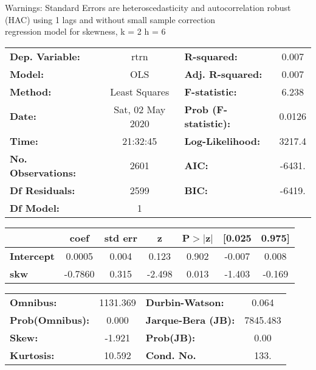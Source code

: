 Warnings: \newline
 [1] Standard Errors are heteroscedasticity and autocorrelation robust (HAC) using 1 lags and without small sample correction\\ 

regression model for skewness, k = 2 h = 6\begin{center}
\begin{tabular}{lclc}
\toprule
\textbf{Dep. Variable:}    &       rtrn       & \textbf{  R-squared:         } &     0.007   \\
\textbf{Model:}            &       OLS        & \textbf{  Adj. R-squared:    } &     0.007   \\
\textbf{Method:}           &  Least Squares   & \textbf{  F-statistic:       } &     6.238   \\
\textbf{Date:}             & Sat, 02 May 2020 & \textbf{  Prob (F-statistic):} &   0.0126    \\
\textbf{Time:}             &     21:32:45     & \textbf{  Log-Likelihood:    } &    3217.4   \\
\textbf{No. Observations:} &        2601      & \textbf{  AIC:               } &    -6431.   \\
\textbf{Df Residuals:}     &        2599      & \textbf{  BIC:               } &    -6419.   \\
\textbf{Df Model:}         &           1      & \textbf{                     } &             \\
\bottomrule
\end{tabular}
\begin{tabular}{lcccccc}
                   & \textbf{coef} & \textbf{std err} & \textbf{z} & \textbf{P$> |$z$|$} & \textbf{[0.025} & \textbf{0.975]}  \\
\midrule
\textbf{Intercept} &       0.0005  &        0.004     &     0.123  &         0.902        &       -0.007    &        0.008     \\
\textbf{skw}       &      -0.7860  &        0.315     &    -2.498  &         0.013        &       -1.403    &       -0.169     \\
\bottomrule
\end{tabular}
\begin{tabular}{lclc}
\textbf{Omnibus:}       & 1131.369 & \textbf{  Durbin-Watson:     } &    0.064  \\
\textbf{Prob(Omnibus):} &   0.000  & \textbf{  Jarque-Bera (JB):  } & 7845.483  \\
\textbf{Skew:}          &  -1.921  & \textbf{  Prob(JB):          } &     0.00  \\
\textbf{Kurtosis:}      &  10.592  & \textbf{  Cond. No.          } &     133.  \\
\bottomrule
\end{tabular}
\end{center}

